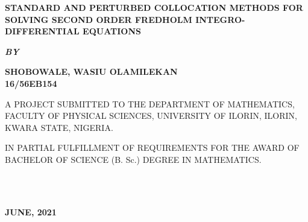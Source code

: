 \documentclass[12pt]{report}
\newcommand{\bt}[1]{\textbf{#1}}
\begin{document}
	
	\clearpage
	\thispagestyle{empty}
	\begin{center}
		\Large \bt{STANDARD AND PERTURBED COLLOCATION METHODS FOR SOLVING SECOND ORDER FREDHOLM INTEGRO-DIFFERENTIAL EQUATIONS}
	\end{center}

	\hspace{7cm}
	
	\begin{center}
		\textbf{\textit{BY}}
	\end{center}
	
	\hspace{5cm}
	
	\begin{center}
		\large \textbf{SHOBOWALE, WASIU OLAMILEKAN 
			\\
			16/56EB154}
	\end{center}
	
	\hspace{9cm}
	
	\begin{center}
		A PROJECT SUBMITTED TO THE DEPARTMENT OF MATHEMATICS, FACULTY OF PHYSICAL SCIENCES, UNIVERSITY OF ILORIN, ILORIN, KWARA STATE, NIGERIA.
	\end{center}

	\hspace{7cm}
	
	\begin{center}
		IN PARTIAL FULFILLMENT OF REQUIREMENTS FOR THE AWARD OF BACHELOR OF SCIENCE (B. Sc.) DEGREE IN MATHEMATICS.
	\end{center}
	\hspace{5cm}
	\\ \\ 
	\begin{center}
		\textbf{JUNE, 2021}
	\end{center}

	\newpage
\end{document}
